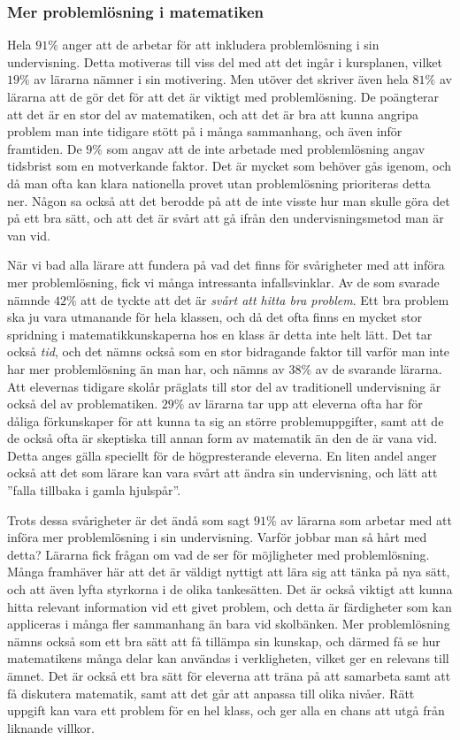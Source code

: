 \subsubsection{Mer problemlösning i matematiken}
\label{sec:MerProblemlosning}

\textcolor{lila}{Hela $91\%$ anger att de arbetar för att inkludera problemlösning i sin undervisning. Detta motiveras till viss del med att det ingår i kursplanen, vilket $19\%$ av lärarna nämner i sin motivering. Men utöver det skriver även hela $81\%$ av lärarna att de gör det för att det är viktigt med problemlösning. De poängterar att det är en stor del av matematiken, och att det är bra att kunna angripa problem man inte tidigare stött på i många sammanhang, och även inför framtiden. De $9\%$ som angav att de inte arbetade med problemlösning angav tidsbrist som en motverkande faktor. Det är mycket som behöver gås igenom, och då man ofta kan klara nationella provet utan problemlösning prioriteras detta ner. Någon sa också att det berodde på att de inte visste hur man skulle göra det på ett bra sätt, och att det är svårt att gå ifrån den undervisningsmetod man är van vid.}

\textcolor{lila}{När vi bad alla lärare att fundera på vad det finns för svårigheter med att införa mer problemlösning, fick vi många intressanta infallsvinklar. Av de som svarade nämnde $42\%$ att de tyckte att det är \textsl{svårt att hitta bra problem}. Ett bra problem ska ju vara utmanande för hela klassen, och då det ofta finns en mycket stor spridning i matematikkunskaperna hos en klass är detta inte helt lätt. Det tar också \textsl{tid}, och det nämns också som en stor bidragande faktor till varför man inte har mer problemlösning än man har, och nämns av $38\%$ av de svarande lärarna. Att elevernas tidigare skolår präglats till stor del av traditionell undervisning är också del av problematiken. $29\%$ av lärarna tar upp att eleverna ofta har för dåliga förkunskaper för att kunna ta sig an större problemuppgifter, samt att de de också ofta är skeptiska till annan form av matematik än den de  är vana vid. Detta anges  gälla speciellt för de högpresterande eleverna. En liten andel anger också att det som lärare kan vara svårt att ändra sin undervisning, och lätt att ''falla tillbaka i gamla hjulspår''.}

\textcolor{lila}{Trots dessa svårigheter är det ändå som sagt $91\%$ av lärarna som arbetar med att införa mer problemlösning i sin undervisning. Varför jobbar man så hårt med detta? Lärarna fick frågan om vad de ser för möjligheter med problemlösning. Många framhäver här att det är väldigt nyttigt att lära sig att tänka på nya sätt, och att även lyfta styrkorna i de olika tankesätten. Det är också viktigt att kunna hitta relevant information vid ett givet problem, och detta är färdigheter som kan appliceras i många fler sammanhang än bara vid skolbänken. Mer problemlösning nämns också som ett bra sätt att få tillämpa sin kunskap, och därmed få se hur matematikens många delar kan användas i verkligheten, vilket ger en relevans till ämnet. Det är också ett bra sätt för eleverna att träna på att samarbeta samt att få diskutera matematik, samt att det går att anpassa till olika nivåer. Rätt uppgift kan vara ett problem för en hel klass, och ger alla en chans att utgå från liknande villkor.}
